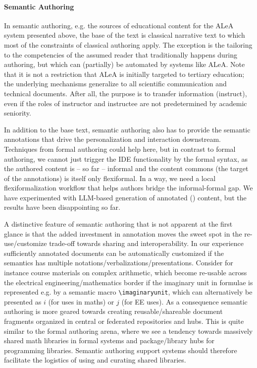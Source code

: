 \documentclass[runningheads]{llncs}
\def\edited#1{#1}
\newcommand\ALeA{\textsf{ALeA}\xspace}
\begin{document}
\paragraph{Semantic Authoring}
In semantic authoring, e.g. the \sTeX sources of educational content for the \ALeA system
presented above, the base of the text is classical narrative text to which most of the
constraints of classical authoring apply.
The exception is the tailoring to the competencies of the assumed reader
that traditionally happens during authoring, but which can (partially) be automated by systems like
\ALeA. Note that it is not a restriction that \ALeA is initially targeted to tertiary
education; the underlying mechanisms generalize to all scientific communication and
technical documents. After all, the purpose is to transfer information (instruct), even if
the roles of instructor and instructee are not predetermined by academic seniority.

In addition to the base text, semantic authoring also has to provide the semantic
annotations that drive the personalization and interaction downstream. Techniques from formal
authoring could help here, but in contrast to formal authoring, we cannot just trigger the
IDE functionality by the formal syntax, as the authored content is -- so far -- informal
and the content commons (the target of the annotations) is itself only flexiformal. In a
way, we need a local flexiformalization workflow that helps authors bridge the
informal-formal gap.
We have experimented with LLM-based generation of annotated (\sTeX) content,
but the results have been disappointing so far.


A distinctive feature of semantic authoring that is not apparent at the first glance is
that the added investment in annotation moves the sweet spot in the re-use/customize
trade-off towards sharing and interoperability. In our experience sufficiently annotated
documents can be automatically customized if the semantics has multiple
notations/verbalizations/presentations. Consider for instance course materials on complex
arithmetic, which become re-usable across the electrical engineering/mathematics border if
the imaginary unit in formulae is represented e.g. by a semantic macro
\lstinline|\imaginaryunit|, which can alternatively \edited{be presented as} $i$ (for uses in maths) or
$j$ (for EE uses). As a consequence semantic authoring is more geared towards creating
reusable/shareable document fragments organized in central or federated repositories and
hubs. This is quite similar to the formal authoring arena, where we see a tendency towards
massively shared math libraries in formal systems and package/library hubs for programming
libraries. Semantic authoring support systems should therefore facilitate the
logistics of using and curating shared libraries.
\end{document}
